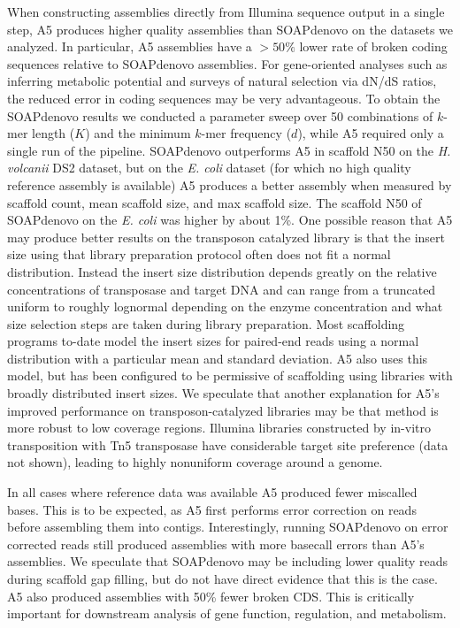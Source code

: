 \documentclass[10pt]{article}
\begin{document}
When constructing assemblies directly from Illumina sequence output in a single step, A5 produces higher quality assemblies 
than SOAPdenovo on the datasets we analyzed. 
In particular, A5 assemblies have a $>50\%$ lower rate of broken coding sequences relative to SOAPdenovo assemblies.
For gene-oriented analyses such as inferring metabolic potential and surveys of natural selection via dN/dS ratios, the reduced error in coding sequences may be very advantageous.
 To obtain the SOAPdenovo results we conducted a parameter sweep 
over 50 combinations of $k$-mer length ($K$) and the minimum $k$-mer frequency ($d$), while A5 required
only a single run of the pipeline.
SOAPdenovo outperforms A5 in scaffold N50 on the \textit{H. volcanii} DS2 dataset, but on the \textit{E. coli} dataset 
(for which no high quality reference assembly is available) 
A5 produces a better assembly when measured by scaffold count, mean scaffold size, and max scaffold size. The scaffold N50 of 
SOAPdenovo on the \textit{E. coli} was higher by about 1\%.
One possible reason that A5 may produce better results on the transposon catalyzed library is that the insert size using
that library preparation protocol often does not fit a normal distribution.  Instead the insert size 
distribution depends greatly on the relative concentrations of transposase and target DNA and can range from a truncated uniform
to roughly lognormal depending on the enzyme concentration and what size selection steps are taken during library preparation.
Most scaffolding programs to-date model the insert sizes for paired-end reads using a normal distribution with a particular
mean and standard deviation. A5 also uses this model, but has been configured to be permissive of scaffolding
using libraries with broadly distributed insert sizes.  We speculate that another explanation for A5's improved performance on transposon-catalyzed 
libraries may be that method is more robust to low coverage regions.  Illumina libraries constructed by in-vitro 
transposition with Tn5 transposase have considerable target site preference (data not shown), leading to highly nonuniform coverage around a genome.

In all cases where reference data was available A5 produced fewer miscalled bases. This is to
be expected, as A5 first performs error correction on reads before assembling them into contigs.
Interestingly, running SOAPdenovo on error corrected reads still produced assemblies with more basecall errors than A5's assemblies.
We speculate that SOAPdenovo may be including lower quality reads during scaffold gap filling, but do not have direct evidence that this is the case.
A5 also produced assemblies
with 50\% fewer broken CDS. This is critically important for downstream analysis of gene function, regulation, and metabolism.
\end{document}
